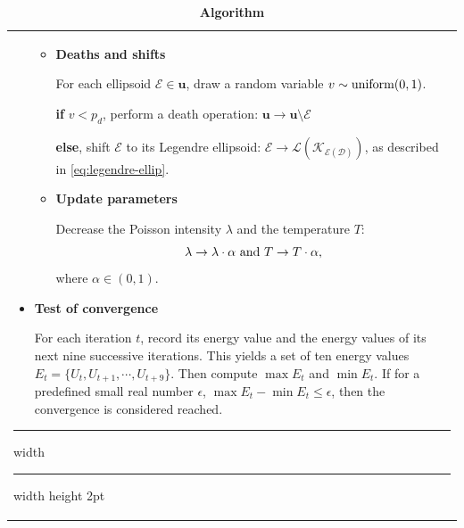 \documentclass[journal]{IEEEtran}
\begin{document}
\begin{table}[!htb]
\begin{center}
\begin{tabular}{ m{9cm} }
\begin{itemize}
\begin{itemize}
        \item \textbf{Deaths and shifts}

          For each ellipsoid $\mathcal{E} \in \mathbf{u}$, draw a
          random variable $v \sim \textnormal{uniform}(0, 1)$.

          \textbf{if} $v < p_d$, perform a death operation:
          $\mathbf{u} \rightarrow \mathbf{u} \setminus \mathcal{E}$

          \textbf{else}, shift $\mathcal{E}$ to its Legendre
          ellipsoid:
          $\mathcal{E} \rightarrow
          \mathcal{L(K_{\mathcal{E}(\mathcal{D})})}$, as described in
          \eqref{eq:legendre-ellip}.

        \item \textbf{Update parameters}

          Decrease the Poisson intensity $\lambda$ and the temperature
          $T$:
          \begin{equation}
            \label{eq:mbds-decrease}
            \lambda \rightarrow \lambda \cdot \alpha \textnormal{ and
            } T \rightarrow T \cdot \alpha,
          \end{equation}
          where $\alpha \in \left( 0, 1 \right)$.

        \end{itemize}

      \item \textbf{Test of convergence}

        For each iteration $t$, record its energy value and the energy
        values of its next nine successive iterations. This yields a
        set of ten energy values
        $E_t = \{U_t, U_{t+1}, \cdots, U_{t+9}\}$. Then compute
        $\max E_t$ and $\min E_t$. If for a predefined small real
        number $\epsilon$, $\max E_t - \min E_t \leq \epsilon$, then
        the convergence is considered reached.

      \end{itemize}
      \vspace{0.3em}
      \hrule width \hsize \kern 0.5mm \hrule width \hsize height 2pt

    \end{tabular}

    \caption{\textbf{Algorithm \thetable}}
    \label{algo-mbds}
  \end{center}
\end{table}

\setcounter{table}{0}
\end{document}
